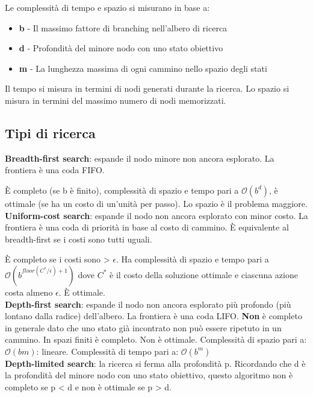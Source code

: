 Le complessità di tempo e spazio si misurano in base a:

\begin{itemize}
\item \textbf{b} - Il massimo fattore di branching nell'albero di ricerca
\item \textbf{d} - Profondità del minore nodo con uno stato obiettivo
\item \textbf{m} - La lunghezza massima di ogni cammino nello spazio degli stati
\end{itemize}

Il tempo si misura in termini di nodi generati durante la ricerca.
Lo spazio si misura in termini del massimo numero di nodi memorizzati.\\

\subsection{Tipi di ricerca}

\textbf{Breadth-first search}: espande il nodo minore non ancora esplorato.
La frontiera è una coda FIFO.

È completo (se b è finito), complessità di spazio e tempo pari a $\mathcal{O}(b^d)$,
è ottimale (se ha un costo di un'unità per passo).
Lo spazio è il problema maggiore.\\

\textbf{Uniform-cost search}: espande il nodo non ancora esplorato con minor costo.
La frontiera è una coda di priorità in base al costo di cammino.
È equivalente al breadth-first se i costi sono tutti uguali.

È completo se i costi sono > $\epsilon$. Ha complessità di spazio e tempo pari a
$\mathcal{O}(b^{floor(C^*/\epsilon)+1})$ dove $C^*$ è il costo della soluzione
ottimale e ciascuna azione costa almeno $\epsilon$. È ottimale.\\

\textbf{Depth-first search}: espande il nodo non ancora esplorato più profondo
(più lontano dalla radice) dell'albero. La frontiera è una coda LIFO.
\textbf{Non} è completo in generale dato che uno stato già incontrato non può
essere ripetuto in un cammino. In spazi finiti è completo. Non è ottimale.
Complessità di spazio pari a: $\mathcal{O}(bm)$: lineare.
Complessità di tempo pari a: $\mathcal{O}(b^m)$\\

\textbf{Depth-limited search}: la ricerca si ferma alla profondità p.
Ricordando che d è la profondità del minore nodo con uno stato obiettivo,
questo algoritmo non è completo se p < d e non è ottimale se p > d.\\

